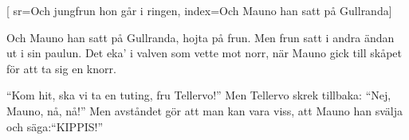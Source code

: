 [ 							
	sr={Och jungfrun hon går i ringen},					
	index={Och Mauno han satt på Gullranda}]		
	
\beginverse*						
Och Mauno han satt på Gullranda,
hojta på frun.
Men frun satt i andra ändan
ut i sin paulun.
Det eka' i valven som vette mot norr,
när Mauno gick till skåpet
för att ta sig en knorr.
\endverse						

\beginverse				
``Kom hit, ska vi ta en tuting,
fru Tellervo!''
Men Tellervo skrek tillbaka:
``Nej, Mauno, nå, nå!''
Men avståndet gör att man kan vara viss,
att Mauno han svälja och säga:``KIPPIS!''
\endverse				
\endsong		
